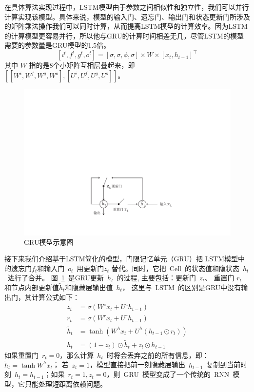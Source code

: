 在具体算法实现过程中，LSTM模型由于参数之间相似性和独立性，我们可以并行计算实现该模型。具体来说，模型的输入门、遗忘门、输出门和状态更新门所涉及的矩阵乘法操作我们可以同时计算，从而提高LSTM模型的计算效率。因为LSTM的计算模型更容易并行，所以他与GRU的计算时间相差无几，尽管LSTM的模型需要的参数量是GRU模型的1.5倍。
\begin{equation}\label{equ:weight}
[i^t,f^t,g^t,o^t ]=[\sigma, \sigma,\phi,\sigma]\times W\times[x_t,h_{t-1}]^\top
\end{equation}
其中 $W$ 指的是8个小矩阵互相层叠起来，即 $[[W^i,W^f,W^g,W^o],[U^i,U^f,U^g,U^o]]$。


\begin{figure}[!t]
  \centering
  \includegraphics[width=0.6\linewidth]{./figures/gru.pdf}
  \caption{GRU模型示意图}\label{fig:gru}
\end{figure}

接下来我们介绍基于LSTM简化的模型，门限记忆单元（GRU）把 LSTM模型中的遗忘门$f_t$和输入门~$o_t$~用更新门$z_t$ 替代。同时，它把~Cell~的状态值和隐状态~$h_t$~进行了合并。 图~\ref{fig:gru}~是GRU更新~$h_t$~的过程, 主要包括：更新门~$z_t$、 重置门 $r_t$ 和节点内部更新值$\tilde h_t$和隐藏层输出值~$h_t$， 这里与~LSTM~的区别是GRU中没有输出门，其计算公式如下：
\begin{equation}\label{equ:gru}
\begin{split}
   z_t &= \sigma ( W^z x_t+ U^z h_{t-1}) \\
   r_t &= \sigma(W^r x_t  + U^r h_{t-1}  )\\
   \tilde h_t  &= \tanh (W^h x_t  + U^h(h_{t-1} \odot r_t) ) \\
   h_t &= (1-z_t)\odot \tilde h_t  + z_t \odot h_{t-1}
\end{split}
\end{equation}
如果重置门~$r_t=0$，那么计算~$h_t$~时将会丢弃之前的所有信息，即：$\tilde h_t=\tanh W^h x_t$； 若~$z_t=1$，模型直接把前一刻隐藏层输出~$h_{t-1}$~复制到当前时刻~$h_t=h_{t-1}$；如果~$r_t=1,z_t=0$，则~GRU~模型变成了一个传统的~RNN~模型，它只能处理短距离依赖问题。


